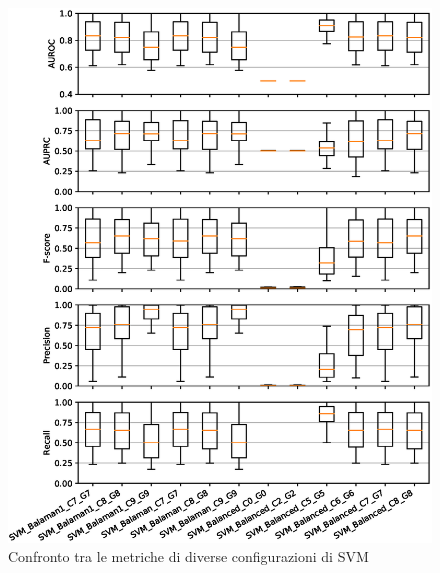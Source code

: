 \documentclass[12pt,a4paper,oneside,hidelinks]{report}
\begin{document}
\begin{figure}[hb]%
    \centering
    \includegraphics[scale = 0.80]{CC-SVM-level1.eps}%
    \caption{Confronto tra le metriche di diverse configurazioni di SVM}%
    \label{figure:liv1.2}%
\end{figure}

\vspace*{\fill}

\vspace*{\fill}
\end{document}
